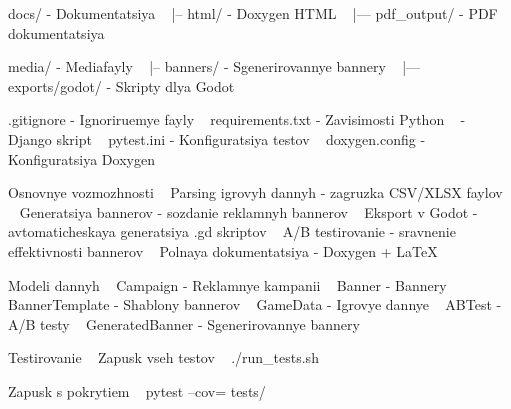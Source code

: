docs/ -\/ Dokumentatsiya ~\newline
 |-- html/ -\/ Doxygen HTML ~\newline
 |--- pdf\+\_\+output/ -\/ PDF dokumentatsiya ~\newline


media/ -\/ Mediafayly ~\newline
 |-- banners/ -\/ Sgenerirovannye bannery ~\newline
 |--- exports/godot/ -\/ Skripty dlya Godot ~\newline


.gitignore -\/ Ignoriruemye fayly ~\newline
 requirements.\+txt -\/ Zavisimosti Python ~\newline
  -\/ Django skript ~\newline
 pytest.\+ini -\/ Konfiguratsiya testov ~\newline
 doxygen.\+config -\/ Konfiguratsiya Doxygen ~\newline


Osnovnye vozmozhnosti ~\newline
 Parsing igrovyh dannyh -\/ zagruzka CSV/\+XLSX faylov ~\newline
 Generatsiya bannerov -\/ sozdanie reklamnyh bannerov ~\newline
 Eksport v Godot -\/ avtomaticheskaya generatsiya .gd skriptov ~\newline
 A/B testirovanie -\/ sravnenie effektivnosti bannerov ~\newline
 Polnaya dokumentatsiya -\/ Doxygen + La\+TeX ~\newline


Modeli dannyh ~\newline
 Campaign -\/ Reklamnye kampanii ~\newline
 Banner -\/ Bannery ~\newline
 Banner\+Template -\/ Shablony bannerov ~\newline
 Game\+Data -\/ Igrovye dannye ~\newline
 ABTest -\/ A/B testy ~\newline
 Generated\+Banner -\/ Sgenerirovannye bannery ~\newline


Testirovanie ~\newline
 Zapusk vseh testov ~\newline
 ./run\+\_\+tests.sh ~\newline


Zapusk s pokrytiem ~\newline
 pytest --cov= tests/ ~\newline


